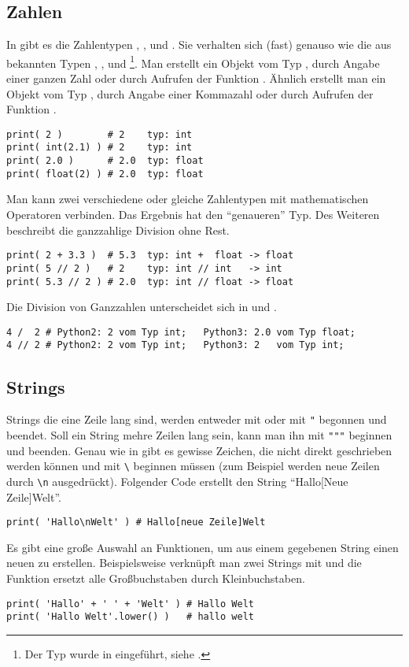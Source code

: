 \subsection{Zahlen}
\label{section:crashkurs:zahlen}
In \Python gibt es die Zahlentypen , ,  und .
Sie verhalten sich (fast) genauso wie die aus \CC bekannten Typen , ,  und %
\footnote{Der Typ  wurde in \CNeunundneunzig eingeführt, siehe \cite{C99}.}.
Man erstellt ein Objekt vom Typ , durch Angabe einer ganzen Zahl oder durch Aufrufen der Funktion .
Ähnlich erstellt man ein Objekt vom Typ , durch Angabe einer Kommazahl oder durch Aufrufen der Funktion .
\begin{lstlisting}
print( 2 )        # 2    typ: int
print( int(2.1) ) # 2    typ: int
print( 2.0 )      # 2.0  typ: float
print( float(2) ) # 2.0  typ: float
\end{lstlisting}
Man kann zwei verschiedene oder gleiche Zahlentypen mit mathematischen Operatoren verbinden.
Das Ergebnis hat den ``genaueren'' Typ.
Des Weiteren beschreibt \lpy{//} die ganzzahlige Division ohne Rest.
\begin{lstlisting}
print( 2 + 3.3 )  # 5.3  typ: int +  float -> float
print( 5 // 2 )   # 2    typ: int // int   -> int
print( 5.3 // 2 ) # 2.0  typ: int // float -> float
\end{lstlisting}
Die Division von Ganzzahlen unterscheidet sich in \PythonZwei und \PythonDrei.
\begin{lstlisting}
4 /  2 # Python2: 2 vom Typ int;   Python3: 2.0 vom Typ float;
4 // 2 # Python2: 2 vom Typ int;   Python3: 2   vom Typ int;
\end{lstlisting}


\subsection{Strings}
\label{section:crashkurs:strings}
Strings die eine Zeile lang sind, werden entweder mit  oder mit \lstinline[style=PyInline]|"| begonnen und beendet.
Soll ein String mehre Zeilen lang sein, kann man ihn mit \lstinline[style=PyInline]|"""| beginnen und beenden.
Genau wie in \CC gibt es gewisse Zeichen, die nicht direkt geschrieben werden können und mit \lstinline[language=C++,style=CPP]|\| beginnen müssen (zum Beispiel werden neue Zeilen durch \lstinline[language=C++,style=CPP]|\n| ausgedrückt).
Folgender Code erstellt den String ``Hallo[Neue Zeile]Welt''.
\begin{lstlisting}
print( 'Hallo\nWelt' ) # Hallo[neue Zeile]Welt
\end{lstlisting}
Es gibt eine große Auswahl an Funktionen, um aus einem gegebenen String einen neuen zu erstellen.
Beispielsweise verknüpft man zwei Strings mit \lpy{+} und die Funktion  ersetzt alle Großbuchstaben durch Kleinbuchstaben.
\begin{lstlisting}
print( 'Hallo' + ' ' + 'Welt' ) # Hallo Welt
print( 'Hallo Welt'.lower() )   # hallo welt
\end{lstlisting}


